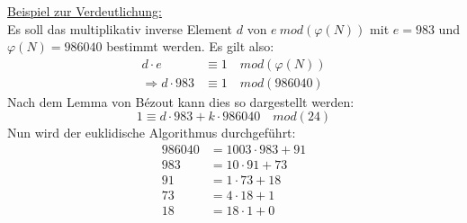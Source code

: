 \underline{Beispiel zur Verdeutlichung:}\\
\label{euklid_beispiel}
Es soll das multiplikativ inverse Element $d$ von $e~mod(\varphi(N))$ mit $e=983$ und\\
$\varphi(N)=986040$ bestimmt werden. Es gilt also:
\begin{align*}
d \cdot e &\equiv 1 \quad mod(\varphi(N))\\
\Rightarrow d \cdot 983 &\equiv 1 \quad mod(986040)
\end{align*}
Nach dem Lemma von Bézout kann dies so dargestellt werden:
\begin{equation*}
1 \equiv d \cdot 983 + k \cdot 986040 \quad mod(24)
\end{equation*}
Nun wird der euklidische Algorithmus durchgeführt:
\begin{align*}
986040 &= 1003 \cdot 983 + 91\\
983 &= 10 \cdot 91 + 73\\
91 &= 1 \cdot 73 + 18\\
73 &= 4 \cdot 18 + 1\\
18 &= 18 \cdot 1 + 0
\end{align*}
